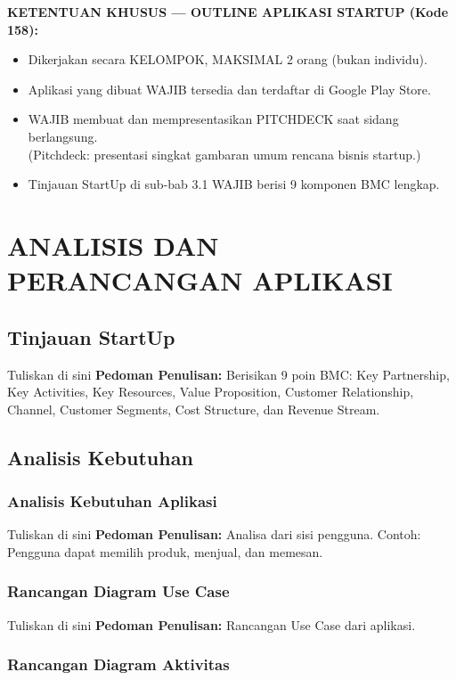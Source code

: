 \noindent\textbf{KETENTUAN KHUSUS — OUTLINE APLIKASI STARTUP (Kode 158):}
\begin{itemize}
    \item Dikerjakan secara KELOMPOK, MAKSIMAL 2 orang (bukan individu).
    \item Aplikasi yang dibuat WAJIB tersedia dan terdaftar di Google Play Store.
    \item WAJIB membuat dan mempresentasikan PITCHDECK saat sidang berlangsung.\\(Pitchdeck: presentasi singkat gambaran umum rencana bisnis startup.)
    \item Tinjauan StartUp di sub-bab 3.1 WAJIB berisi 9 komponen BMC lengkap.
\end{itemize}

\vspace{0.5cm}


\chapter{ANALISIS DAN PERANCANGAN APLIKASI}
\section{Tinjauan StartUp}


Tuliskan di sini \textbf{Pedoman Penulisan:} Berisikan 9 poin BMC: Key Partnership, Key Activities, Key Resources, Value Proposition, Customer Relationship, Channel, Customer Segments, Cost Structure, dan Revenue Stream.


\section{Analisis Kebutuhan}
\subsection{Analisis Kebutuhan Aplikasi}


Tuliskan di sini \textbf{Pedoman Penulisan:} Analisa dari sisi pengguna. Contoh: Pengguna dapat memilih produk, menjual, dan memesan.


\subsection{Rancangan Diagram Use Case}


Tuliskan di sini \textbf{Pedoman Penulisan:} Rancangan Use Case dari aplikasi.


\subsection{Rancangan Diagram Aktivitas}


